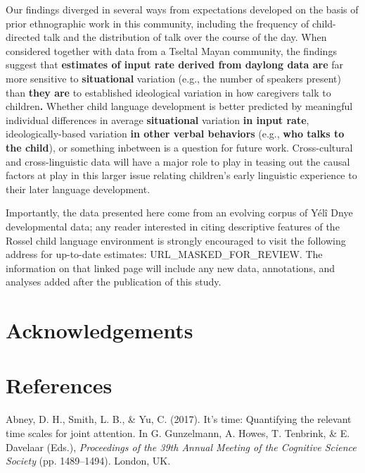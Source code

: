 \documentclass[,man,floatsintext]{apa6}
\begin{document}
Our findings diverged in several ways from expectations developed on the
basis of prior ethnographic work in this community, including the
frequency of child-directed talk and the distribution of talk over the
course of the day. When considered together with data from a Tseltal
Mayan community, the findings suggest that \textbf{estimates of input
rate derived from daylong data are} far more sensitive to
\textbf{situational} variation (e.g., the number of speakers present)
than \textbf{they are} to established ideological variation in how
caregivers talk to children\textbf{.} Whether child language development
is better predicted by meaningful individual differences in average
\textbf{situational} variation \textbf{in input rate},
ideologically-based variation \textbf{in other verbal behaviors} (e.g.,
\textbf{who talks to the child}), or something inbetween is a question
for future work. Cross-cultural and cross-linguistic data will have a
major role to play in teasing out the causal factors at play in this
larger issue relating children's early linguistic experience to their
later language development.

Importantly, the data presented here come from an evolving corpus of
Yélî Dnye developmental data; any reader interested in citing
descriptive features of the Rossel child language environment is
strongly encouraged to visit the following address for up-to-date
estimates: URL\_MASKED\_FOR\_REVIEW. The information on that linked page
will include any new data, annotations, and analyses added after the
publication of this study.

\section{Acknowledgements}\label{acknowledgements}

\newpage

\section{References}\label{refs}

\begingroup
\setlength{\parindent}{-0.5in} \setlength{\leftskip}{0.5in}

\hypertarget{refs}{}
\hypertarget{ref-abney2017time}{}
Abney, D. H., Smith, L. B., \& Yu, C. (2017). It's time: Quantifying the
relevant time scales for joint attention. In G. Gunzelmann, A. Howes, T.
Tenbrink, \& E. Davelaar (Eds.), \emph{Proceedings of the 39th Annual
Meeting of the Cognitive Science Society} (pp. 1489--1494). London, UK.
\end{document}
